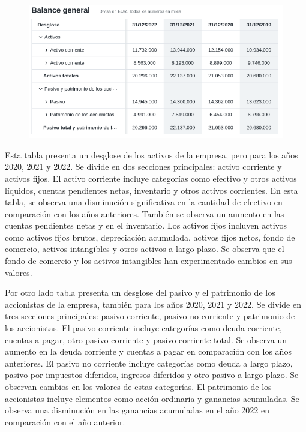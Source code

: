 \documentclass[a4paper,12pt]{article}
\begin{document}
\begin{figure}[ht!]
	\centering

	\includegraphics[width=.9\textwidth]{AdidasBA}
\end{figure}


Esta tabla presenta un desglose de los activos de la empresa, pero para los años 2020, 2021 y 2022.
Se divide en dos secciones principales: activo corriente y activos fijos.
El activo corriente incluye categorías como efectivo y otros activos líquidos, cuentas pendientes netas, inventario y otros activos corrientes.
En esta tabla, se observa una disminución significativa en la cantidad de efectivo en comparación con los años anteriores. También se observa un aumento en las cuentas pendientes netas y en el inventario.
Los activos fijos incluyen activos como activos fijos brutos, depreciación acumulada, activos fijos netos, fondo de comercio, activos intangibles y otros activos a largo plazo.
Se observa que el fondo de comercio y los activos intangibles han experimentado cambios en sus valores.

Por otro lado tabla presenta un desglose del pasivo y el patrimonio de los accionistas de la empresa, también para los años 2020, 2021 y 2022.
Se divide en tres secciones principales: pasivo corriente, pasivo no corriente y patrimonio de los accionistas.
El pasivo corriente incluye categorías como deuda corriente, cuentas a pagar, otro pasivo corriente y pasivo corriente total. Se observa un aumento en la deuda corriente y cuentas a pagar en comparación con los años anteriores.
El pasivo no corriente incluye categorías como deuda a largo plazo, pasivo por impuestos diferidos, ingresos diferidos y otro pasivo a largo plazo. Se observan cambios en los valores de estas categorías.
El patrimonio de los accionistas incluye elementos como acción ordinaria y ganancias acumuladas. Se observa una disminución en las ganancias acumuladas en el año 2022 en comparación con el año anterior.
\end{document}
